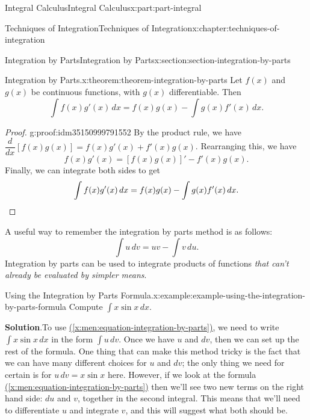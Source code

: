 \documentclass[twoside,10pt,]{tufte-book}
\newcommand{\blocktitlefont}{\relax}
\newcommand{\xreffont}{\relax}
\numberwithin{equation}{part}
\newcommand{\qedhere}{\relax}
\newcommand{\dv}[3][]{\dfrac{d^{#1} #2}{d #3^{#1}}}
\begin{document}
\begin{partptx}{Integral Calculus}{}{Integral Calculus}{}{}{x:part:part-integral}
\begin{chapterptx}{Techniques of Integration}{}{Techniques of Integration}{}{}{x:chapter:techniques-of-integration}
\begin{sectionptx}{Integration by Parts}{}{Integration by Parts}{}{}{x:section:section-integration-by-parts}
\begin{theorem}{Integration by Parts.}{}{x:theorem:theorem-integration-by-parts}%
%
Let \(f(x)\) and \(g(x)\) be continuous functions, with \(g(x)\) differentiable. Then%
%
\begin{equation*}
\int f(x)g'(x)\,dx = f(x)g(x) - \int g(x)f'(x)\,dx.
\end{equation*}
\end{theorem}
\begin{proof}{}{g:proof:idm35150999791552}
By the product rule, we have \(\dv{}{x}[f(x)g(x)] = f(x)g'(x) + f'(x)g(x)\). Rearranging this, we have%
\begin{equation*}
f(x)g'(x) = [f(x)g(x)]' - f'(x)g(x).
\end{equation*}
Finally, we can integrate both sides to get%
\begin{equation*}
\int f(x)g'(x)\,dx = f(x)g(x) - \int g(x)f'(x)\,dx.\qedhere
\end{equation*}
%
\end{proof}
A useful way to remember the integration by parts method is as follows:%
\begin{equation}
\int u\,dv = uv - \int v\,du.\label{x:men:equation-integration-by-parts}
\end{equation}
Integration by parts can be used to integrate products of functions \emph{that can't already be evaluated by simpler means}.%
\begin{example}{Using the Integration by Parts Formula.}{x:example:example-using-the-integration-by-parts-formula}%
Compute \(\int x\sin x\,dx\).%
\par\smallskip%
\noindent\textbf{\blocktitlefont Solution}.\hypertarget{g:solution:idm35150999787328}{}\quad{}To use \hyperref[x:men:equation-integration-by-parts]{({\xreffont\ref{x:men:equation-integration-by-parts}})}, we need to write \(\int x\sin x\,dx\) in the form \(\int u\,dv\). Once we have \(u\) and \(dv\), then we can set up the rest of the formula. One thing that can make this method tricky is the fact that we can have many different choices for \(u\) and \(dv\); the only thing we need for certain is for \(u\,dv = x\sin x\) here. However, if we look at the formula \hyperref[x:men:equation-integration-by-parts]{({\xreffont\ref{x:men:equation-integration-by-parts}})} then we'll see two new terms on the right hand side: \(du\) and \(v\), together in the second integral. This means that we'll need to differentiate \(u\) and integrate \(v\), and this will suggest what both should be.%

\end{example}
\end{sectionptx}
\end{chapterptx}
\end{partptx}
\end{document}
